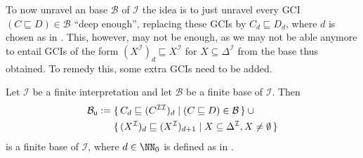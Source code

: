 To now unravel an \ELgfpbot base $\mathcal{B}$ of $\mathcal{I}$ the idea is to just
unravel every GCI $(C \sqsubseteq D) \in \mathcal{B}$ ``deep enough'', \ie replacing these
GCIs by $C_d \sqsubseteq D_d$, where $d$ is chosen as in .
This, however, may not be enough, as we may not be able anymore to entail GCIs of the form
$(X^{\mathcal{I}})_d \sqsubseteq X^{\mathcal{I}}$ for $X \subseteq \Delta^{\mathcal{I}}$
from the base thus obtained.  To remedy this, some extra GCIs need to be added.

\begin{Theorem}
  \label{thm:unravelling-ELgfpbot-bases}
  Let $\mathcal{I}$ be a finite interpretation and let $\mathcal{B}$ be a finite \ELgfpbot
  base of $\mathcal{I}$.  Then
  \begin{align*}
    \mathcal{B}_{\mathsf{u}} &:= \set{ C_d \sqsubseteq (C^{\mathcal{I}\mathcal{I}})_d \mid (C
      \sqsubseteq D) \in \mathcal{B} } \cup {} \\
    &\phantom{{}:={}} \set{ (X^{\mathcal{I}})_d \sqsubseteq (X^{\mathcal{I}})_{d+1} \mid X
      \subseteq \Delta^{\mathcal{I}}, X \neq \emptyset }
  \end{align*}
  is a finite \ELbot base of $\mathcal{I}$, where $d \in \NN_0$ is defined as in
  .
\end{Theorem}

